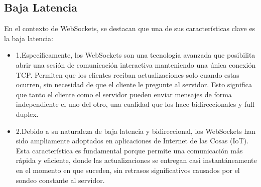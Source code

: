 \documentclass{report}
\begin{document}
\subsection{Baja Latencia}
En el contexto de WebSockets, se  destacan que una de sus características clave es la baja latencia:
\begin{itemize}
    \item 1.Específicamente, los WebSockets son una tecnología avanzada que posibilita abrir una sesión de comunicación interactiva 
    manteniendo una única conexión TCP. Permiten que los clientes reciban actualizaciones solo cuando estas ocurren, sin necesidad de 
    que el cliente le pregunte al servidor. Esto significa que tanto el cliente como el servidor pueden enviar mensajes de forma 
    independiente el uno del otro, una cualidad que los hace bidireccionales y full duplex.
    \item 2.Debido a su naturaleza de baja latencia y bidireccional, los WebSockets han sido ampliamente adoptados en aplicaciones 
    de Internet de las Cosas (IoT). Esta característica es fundamental porque permite una comunicación más rápida y eficiente, donde 
    las actualizaciones se entregan casi instantáneamente en el momento en que suceden, sin retrasos significativos causados por el 
    sondeo constante al servidor.
\end{itemize}
\end{document}
